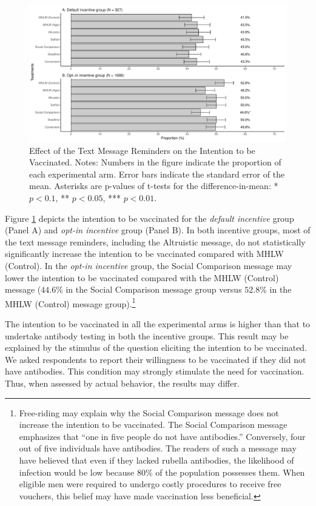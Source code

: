 \documentclass[
]{article}
\begin{document}
\begin{figure}[t]
\includegraphics{discussion-paper_files/figure-latex/ttest-int-vacc-1} \caption{Effect of the Text Message Reminders on the Intention to be Vaccinated. Notes: Numbers in the figure indicate the proportion of each experimental arm. Error bars indicate the standard error of the mean. Asterisks are p-values of t-tests for the difference-in-mean: * $p < 0.1$, ** $p < 0.05$, *** $p < 0.01$.}\label{fig:ttest-int-vacc}
\end{figure}

Figure \ref{fig:ttest-int-vacc} depicts the intention to be vaccinated for the \emph{default incentive} group (Panel A) and \emph{opt-in incentive} group (Panel B). In both incentive groups, most of the text message reminders, including the Altruistic message, do not statistically significantly increase the intention to be vaccinated compared with MHLW (Control). In the \emph{opt-in incentive} group, the Social Comparison message may lower the intention to be vaccinated compared with the MHLW (Control) message (\(44.6\)\% in the Social Comparison message group versus \(52.8\)\% in the MHLW (Control) message group).\footnote{Free-riding may explain why the Social Comparison message does not increase the intention to be vaccinated. The Social Comparison message emphasizes that ``one in five people do not have antibodies.'' Conversely, four out of five individuals have antibodies. The readers of such a message may have believed that even if they lacked rubella antibodies, the likelihood of infection would be low because 80\% of the population possesses them. When eligible men were required to undergo costly procedures to receive free vouchers, this belief may have made vaccination less beneficial.}

The intention to be vaccinated in all the experimental arms is higher than that to undertake antibody testing in both the incentive groups. This result may be explained by the stimulus of the question eliciting the intention to be vaccinated. We asked respondents to report their willingness to be vaccinated if they did not have antibodies. This condition may strongly stimulate the need for vaccination. Thus, when assessed by actual behavior, the results may differ.
\end{document}
